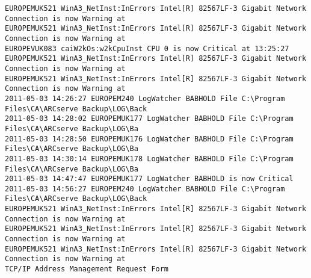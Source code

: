 \begin{lstlisting}
EUROPEMUK521 WinA3_NetInst:InErrors Intel[R] 82567LF-3 Gigabit Network Connection is now Warning at
EUROPEMUK521 WinA3_NetInst:InErrors Intel[R] 82567LF-3 Gigabit Network Connection is now Warning at
EUROPEVUK083 caiW2kOs:w2kCpuInst CPU 0 is now Critical at 13:25:27
EUROPEMUK521 WinA3_NetInst:InErrors Intel[R] 82567LF-3 Gigabit Network Connection is now Warning at
EUROPEMUK521 WinA3_NetInst:InErrors Intel[R] 82567LF-3 Gigabit Network Connection is now Warning at
2011-05-03 14:26:27 EUROPEM240 LogWatcher BABHOLD File C:\Program Files\CA\ARCserve Backup\LOG\Back
2011-05-03 14:28:02 EUROPEMUK177 LogWatcher BABHOLD File C:\Program Files\CA\ARCserve Backup\LOG\Ba
2011-05-03 14:28:50 EUROPEMUK176 LogWatcher BABHOLD File C:\Program Files\CA\ARCserve Backup\LOG\Ba
2011-05-03 14:30:14 EUROPEMUK178 LogWatcher BABHOLD File C:\Program Files\CA\ARCserve Backup\LOG\Ba
2011-05-03 14:47:47 EUROPEMUK177 LogWatcher BABHOLD is now Critical
2011-05-03 14:56:27 EUROPEM240 LogWatcher BABHOLD File C:\Program Files\CA\ARCserve Backup\LOG\Back
EUROPEMUK521 WinA3_NetInst:InErrors Intel[R] 82567LF-3 Gigabit Network Connection is now Warning at
EUROPEMUK521 WinA3_NetInst:InErrors Intel[R] 82567LF-3 Gigabit Network Connection is now Warning at
EUROPEMUK521 WinA3_NetInst:InErrors Intel[R] 82567LF-3 Gigabit Network Connection is now Warning at
TCP/IP Address Management Request Form
\end{lstlisting}
